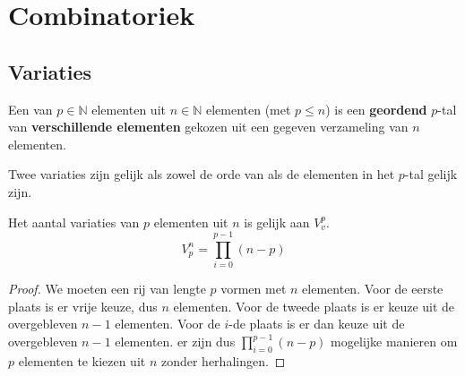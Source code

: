 \documentclass[main.tex]{subfiles}
\begin{document}
\chapter{Combinatoriek}
\label{cha:combinatoriek}

\section{Variaties}
\label{sectie:variaties}

\begin{de}
  Een  van $p\in \mathbb{N}$ elementen uit $n\in \mathbb{N}$ elementen (met $p \le n$) is een \textbf{geordend} $p$-tal van \textbf{verschillende elementen} gekozen uit een gegeven verzameling van $n$ elementen.    
\end{de}

\begin{de}
  Twee variaties zijn gelijk als zowel de orde van als de elementen in het $p$-tal gelijk zijn.
\end{de}

\begin{st}
  Het aantal variaties van $p$ elementen uit $n$ is gelijk aan $V_{v}^{p}$.
  \[
  V_{p}^{n} = \prod_{i=0}^{p-1}(n-p)
  \]

  \begin{proof}
    We moeten een rij van lengte $p$ vormen met $n$ elementen.
    Voor de eerste plaats is er vrije keuze, dus $n$ elementen.
    Voor de tweede plaats is er keuze uit de overgebleven $n-1$ elementen.
    Voor de $i$-de plaats is er dan keuze uit de overgebleven $n-1$ elementen.
    er zijn dus $\prod_{i=0}^{p-1}(n-p)$ mogelijke manieren om $p$ elementen te kiezen uit $n$ zonder herhalingen.
  \end{proof}
\end{st}
\end{document}
